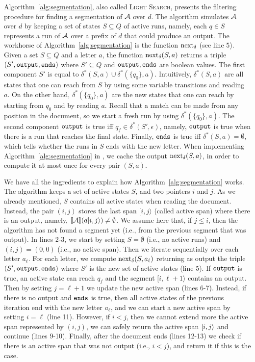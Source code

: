Algorithm~\ref{alg:segmentation}, also called \textsc{Light Search}, presents the filtering procedure for finding a segmentation of $\mathcal{A}$ over $d$. The algorithm simulates $\mathcal{A}$ over $d$ by keeping a set of states $S \subseteq Q$ of active runs, namely, each $q \in S$ represents a run of $\mathcal{A}$ over a prefix of $d$ that could produce an output. The workhorse of Algorithm~\ref{alg:segmentation} is the function $\operatorname{next}_{\delta}$ (see line 5). Given a set $S \subseteq Q$ and a letter $a$, the function $\operatorname{next}_{\delta}(S, a)$ returns a triple $(S', \texttt{output}, \texttt{ends})$ where $S' \subseteq Q$ and $\texttt{output}, \texttt{ends}$ are boolean values. The first component $S'$ is equal to $\delta^*(S, a) \cup \delta^*(\{q_0\}, a)$. Intuitively, $\delta^*(S, a)$ are all states that one can reach from $S$  by using some variable transitions and reading~$a$. On the other hand, $\delta^*(\{q_0\}, a)$ are the new states that one can reach by starting from $q_0$ and by reading $a$. Recall that a match can be made from any position in the document, so we start a fresh run by using $\delta^*(\{q_0\}, a)$.
The second component $\texttt{output}$ is true iff $q_f \in \delta^*(S', \epsilon)$, namely, $\texttt{output}$ is true when there is a run that reaches the final state.
Finally, $\texttt{ends}$ is true iff $\delta^*(S, a) = \emptyset$, which tells whether the runs in $S$ ends with the new letter.
When implementing Algorithm~\ref{alg:segmentation} in \rematch, we cache the output $\operatorname{next}_{\delta}(S, a)$, in order to compute it at most once for every pair $(S,a)$.

We have all the ingredients to explain how Algorithm~\ref{alg:segmentation} works. The algorithm keeps a set of active states $S$, and two pointers $i$ and $j$. As we already mentioned, $S$ contains all active states when reading the document. Instead, the pair $(i, j)$ stores the last span $[i, j\rangle$ (called active span) where there is an output, namely, $\llbracket\mathcal{A}\rrbracket(d[i, j\rangle) \neq \emptyset$. We assume here that, if $j \leq i$, then the algorithm has not found a segment yet (i.e., from the previous segment that was output). In lines 2-3, we start by setting $S = \emptyset$ (i.e., no active runs) and $(i,j) = (0,0)$ (i.e., no active span). Then we iterate sequentially over each letter $a_\ell$. For each letter, we compute $\operatorname{next}_{\delta}(S, a_\ell)$ returning as output the triple $(S', \texttt{output}, \texttt{ends})$ where $S'$ is the new set of active states (line 5). If $\texttt{output}$ is true, an active state can reach $q_f$ and the segment $[i, \ell+1\rangle$ contains an output. Then by setting $j = \ell+1$ we update the new active span (lines 6-7). Instead, if there is no output and $\texttt{ends}$ is true, then all active states of the previous iteration end with the new letter $a_{\ell}$, and we can start a new active span by setting $i = \ell$ (line 11). However, if $i < j$, then we cannot extend more the active span represented by $(i,j)$, we can safely return the active span $[i, j\rangle$ and continue (lines 9-10). Finally, after the document ends (lines 12-13) we check if there is an active span that was not output (i.e., $i < j$), and return it if this is the case.

